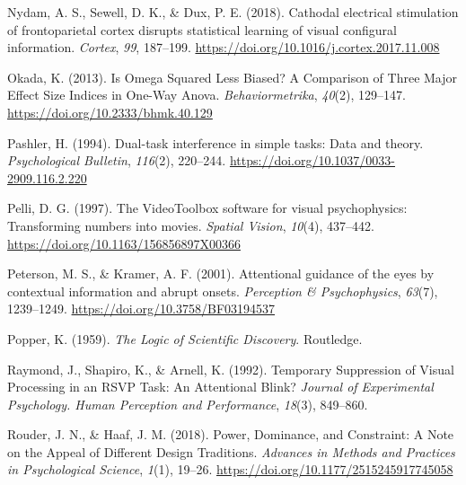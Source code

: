 \documentclass[
  man]{apa6}
\newlength{\cslhangindent}
\newlength{\cslentryspacingunit} %
\newenvironment{CSLReferences}[2] %
 {%
  \setlength{\parindent}{0pt}
  \ifodd #1
  \let\oldpar\par
  \def\par{\hangindent=\cslhangindent\oldpar}
  \fi
  \setlength{\parskip}{#2\cslentryspacingunit}
 }%
 {}
\begin{document}
\begin{CSLReferences}{1}{0}
\leavevmode{}%
Nydam, A. S., Sewell, D. K., \& Dux, P. E. (2018). Cathodal electrical stimulation of frontoparietal cortex disrupts statistical learning of visual configural information. \emph{Cortex}, \emph{99}, 187--199. \url{https://doi.org/10.1016/j.cortex.2017.11.008}

\leavevmode{}%
Okada, K. (2013). Is {Omega Squared Less Biased}? A {Comparison} of {Three Major Effect Size Indices} in {One-Way Anova}. \emph{Behaviormetrika}, \emph{40}(2), 129--147. \url{https://doi.org/10.2333/bhmk.40.129}

\leavevmode{}%
Pashler, H. (1994). Dual-task interference in simple tasks: Data and theory. \emph{Psychological Bulletin}, \emph{116}(2), 220--244. \url{https://doi.org/10.1037/0033-2909.116.2.220}

\leavevmode{}%
Pelli, D. G. (1997). The {VideoToolbox} software for visual psychophysics: Transforming numbers into movies. \emph{Spatial Vision}, \emph{10}(4), 437--442. \url{https://doi.org/10.1163/156856897X00366}

\leavevmode{}%
Peterson, M. S., \& Kramer, A. F. (2001). Attentional guidance of the eyes by contextual information and abrupt onsets. \emph{Perception \& Psychophysics}, \emph{63}(7), 1239--1249. \url{https://doi.org/10.3758/BF03194537}

\leavevmode{}%
Popper, K. (1959). \emph{The {Logic} of {Scientific Discovery}}. {Routledge}.

\leavevmode{}%
Raymond, J., Shapiro, K., \& Arnell, K. (1992). Temporary {Suppression} of {Visual Processing} in an {RSVP Task}: {An Attentional Blink}? \emph{Journal of Experimental Psychology. Human Perception and Performance}, \emph{18}(3), 849--860.

\leavevmode{}%
Rouder, J. N., \& Haaf, J. M. (2018). Power, {Dominance}, and {Constraint}: {A Note} on the {Appeal} of {Different Design Traditions}. \emph{Advances in Methods and Practices in Psychological Science}, \emph{1}(1), 19--26. \url{https://doi.org/10.1177/2515245917745058}


\end{CSLReferences}
\end{document}
